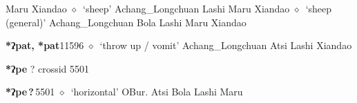 \begin{list}{}{\leftmargin=1.5em \itemindent=-1.5em}
\hspace{1ex}
         Maru 
\hspace{1ex}
         Xiandao 
\hspace{1ex}
         $\diamond$~`sheep'
         Achang\_Longchuan 
\hspace{1ex}
         Lashi 
\hspace{1ex}
         Maru 
\hspace{1ex}
         Xiandao 
\hspace{1ex}
         $\diamond$~`sheep (general)'
         Achang\_Longchuan 
\hspace{1ex}
         Bola 
\hspace{1ex}
         Lashi 
\hspace{1ex}
         Maru 
\hspace{1ex}
         Xiandao 
  \item {\footnotesize \textbf{*ʔpat, *pat}}{\tiny 11596}
\hspace{1ex}
         $\diamond$~`throw up / vomit'
         Achang\_Longchuan 
\hspace{1ex}
         Atsi 
\hspace{1ex}
         Lashi 
\hspace{1ex}
         Xiandao 
  \end{list}
\item
\textbf{*ʔpe}
?
  {\tiny crossid 5501}
  \begin{list}{}{\leftmargin=1.5em \itemindent=-1.5em}
  \item {\footnotesize \textbf{*ʔpe\,?\,}}{\tiny 5501}
         $\diamond$~`horizontal'
         OBur. 
\hspace{1ex}
         Atsi 
\hspace{1ex}
         Bola 
\hspace{1ex}
         Lashi 
\hspace{1ex}
         Maru 
  \end{list}
